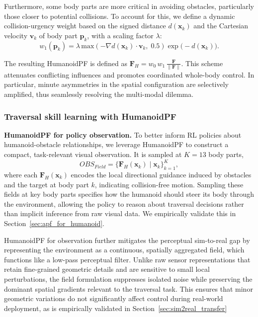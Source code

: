 Furthermore, some body parts are more critical in avoiding obstacles, particularly those closer to potential collisions. To account for this, we define a dynamic collision-urgency weight based on the signed distance $d(\mathbf{x}_k)$ and the Cartesian velocity $\mathbf{v}_k$ of body part $\mathbf{p}_k$, with a scaling factor $\lambda$:
\begin{equation}
w_1(\mathbf{p}_k) = \lambda \,
\mathrm{max}\!\left( - \nabla d(\mathbf{x}_k) \cdot \mathbf{v}_k,\; 0.5 \right)\exp\!\big(-d(\mathbf{x}_k)\big).
\label{eq:field_magnitude}
\end{equation}

The resulting HumanoidPF is defined as $
\mathbf{F}_H = w_0\, w_1 \,\frac{\mathbf{F}}{\lVert \mathbf{F} \rVert}$. 
This scheme attenuates conflicting influences and promotes coordinated whole-body control. In particular, minute asymmetries in the spatial configuration are selectively amplified, thus seamlessly resolving the multi-modal dilemma.


\subsubsection{Traversal skill learning with HumanoidPF}

\textbf{HumanoidPF for policy observation.}
To better inform RL policies about humanoid-obstacle relationships, we leverage HumanoidPF to construct a compact, task-relevant visual observation. It is sampled at $K=13$ body parts,
\begin{equation}
OBS_{Field} = \{ \mathbf{F}_H(\mathbf{x}_k) \mid \mathbf{x}_k\}^K_{k = 1},
\end{equation}
where each $\mathbf{F}_H(\mathbf{x}_k)$ encodes the local directional guidance induced by obstacles and the target at body part $k$, indicating collision-free motion. Sampling these fields at key body parts specifies how the humanoid should steer its body through the environment, allowing the policy to reason about traversal decisions rather than implicit inference from raw visual data. We empirically validate this in Section~\ref{sec:apf_for_humanoid}.

HumanoidPF for observation further mitigates the perceptual sim-to-real gap by representing the environment as a continuous, spatially aggregated field, which functions like a low-pass perceptual filter. Unlike raw sensor representations that retain fine-grained geometric details and are sensitive to small local perturbations, the field formulation suppresses isolated noise while preserving the dominant spatial gradients relevant to the traversal task. This ensures that minor geometric variations do not significantly affect control during real-world deployment, as is empirically validated in Section~\ref{sec:sim2real_transfer}



